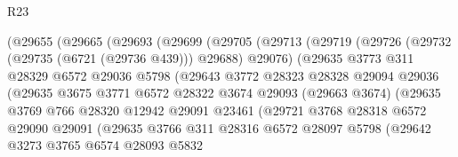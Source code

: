 \begin{lexlean}{R23}
\begin{coremodule}
                    (@29655
                      (@29665
                        (@29693
                          (@29699
                            (@29705
                              (@29713
                                (@29719
                                  (@29726 (@29732 (@29735 (@6721 (@29736 @439))) @29688) @29076)
                                  (@29635
                                    @3773
                                    @311
                                    @28329
                                    @6572
                                    @29036
                                    @5798
                                    (@29643
                                      @3772
                                      @28323
                                      @28328
                                      @29094
                                      @29036
                                      (@29635
                                        @3675
                                        @3771
                                        @6572
                                        @28322
                                        @3674
                                        @29093
                                        (@29663 @3674)
                                        (@29635
                                          @3769
                                          @766
                                          @28320
                                          @12942
                                          @29091
                                          @23461
                                          (@29721
                                            @3768
                                            @28318
                                            @6572
                                            @29090
                                            @29091
                                            (@29635
                                              @3766
                                              @311
                                              @28316
                                              @6572
                                              @28097
                                              @5798
                                              (@29642
                                                @3273
                                                @3765
                                                @6574
                                                @28093
                                                @5832

\end{coremodule}
\end{lexlean}

